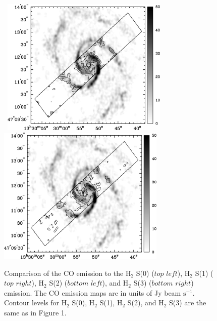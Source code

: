 \documentclass[manuscript]{aastex}
\begin{document}
\begin{figure}[!h]
\centerline{\hbox{\hspace{0.0in}
\includegraphics[width=8cm,angle=0]{bw_co_h2s2.jpg}
\hspace{0.1in}
\includegraphics[width=8cm,angle=0]{bw_co_h2s3.jpg}}}
\caption{Comparison of the CO emission to the $\mathrm{H_2}$ S(0) ($top$ $left$),  $\mathrm{H_2}$ S(1) ($top$ $right$),  $\mathrm{H_2}$ S(2) ($bottom$ $left$),  and $\mathrm{H_2}$ S(3) ($bottom$ $right$) emission.  The CO emission maps are in units of Jy beam $\mathrm{s^{-1}}$.  Contour levels for $\mathrm{H_2}$ S(0), $\mathrm{H_2}$ S(1), $\mathrm{H_2}$ S(2), and $\mathrm{H_2}$ S(3) are the same as in Figure 1.\label{fig8}}
\end{figure}

\clearpage
\end{document}
